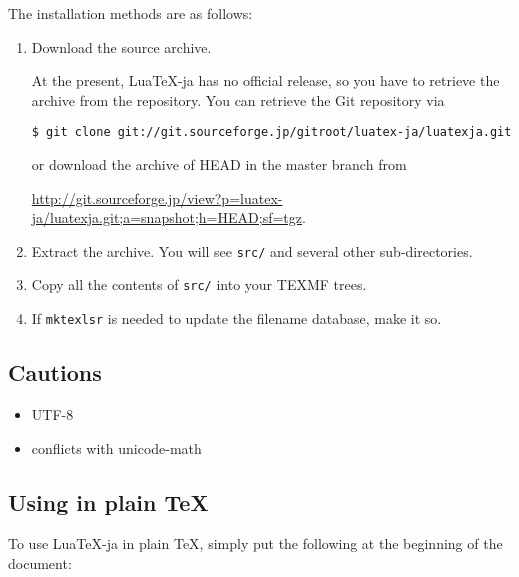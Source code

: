 \documentclass[a4paper,titlepage]{article}
\begin{document}
The installation methods are as follows:
\begin{enumerate}
\item Download the source archive.

At the present, Lua\TeX-ja has no official release, so you have to retrieve
the archive from the repository.
You can retrieve the Git repository via
\begin{verbatim}
$ git clone git://git.sourceforge.jp/gitroot/luatex-ja/luatexja.git
\end{verbatim} 
or download the archive of HEAD in the master branch from
\begin{flushleft}
\url{http://git.sourceforge.jp/view?p=luatex-ja/luatexja.git;a=snapshot;h=HEAD;sf=tgz}.
\end{flushleft}
\item Extract the archive. You will see {\tt src/} and several other sub-directories.
\item Copy all the contents of {\tt src/} into your TEXMF trees.
\item If {\tt mktexlsr} is needed to update the filename database, make it so.
\end{enumerate}

\subsection{Cautions}
\begin{itemize}
\item UTF-8
\item conflicts with unicode-math
\end{itemize}

\subsection{Using in plain \TeX}
To use Lua\TeX-ja in plain \TeX, simply put the following  at the beginning of the document:
\begin{verbatim}

\end{verbatim}
\end{document}
